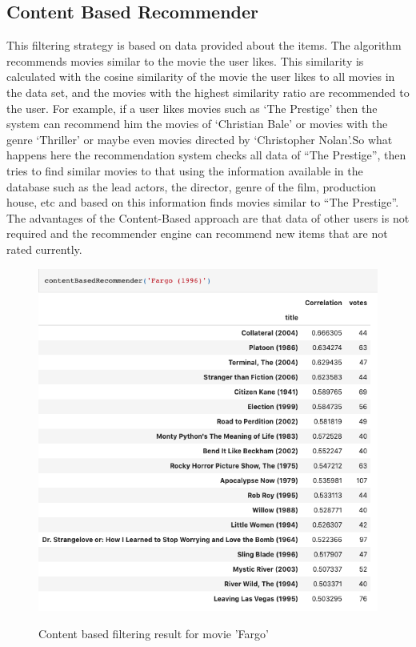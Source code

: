 \documentclass[onecolumn]{article}
\begin{document}
\pagebreak

\subsection{Content Based Recommender}
\hspace{0.5cm}This filtering strategy is based on data provided about the items. The algorithm recommends movies similar to the movie the user likes. This similarity is calculated with the cosine similarity of the movie the user likes to all movies in the data set, and the movies with the highest similarity ratio are recommended to the user. For example, if a user likes movies such as ‘The Prestige’ then the system can recommend him the movies of ‘Christian Bale’ or movies with the genre ‘Thriller’ or maybe even movies directed by ‘Christopher Nolan’.So what happens here the recommendation system checks all data of  “The Prestige”, then tries to find similar movies to that using the information available in the database such as the lead actors, the director, genre of the film, production house, etc and based on this information finds movies similar to “The Prestige”. The advantages of the Content-Based approach are that data of other users is not required and the recommender engine can recommend new items that are not rated currently.

\hfill

\begin{figure}[h!t]
\centering
{\centering
    \includegraphics[width=0.8\linewidth]{figures/result1.png}}        
\caption{Content based filtering result for movie 'Fargo'}
\end{figure}
\end{document}
